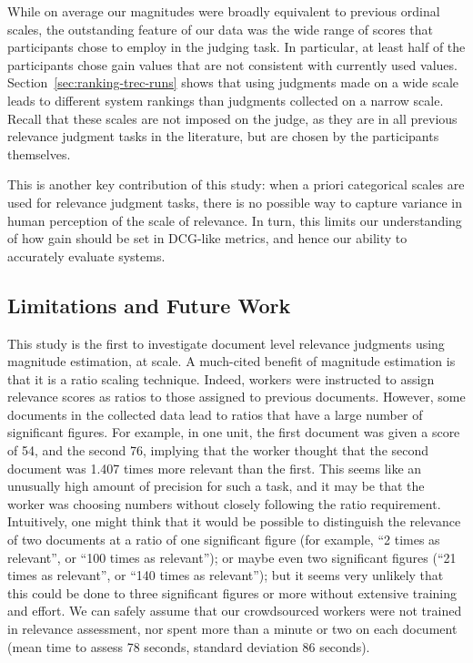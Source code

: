 While on average our magnitudes were broadly equivalent to previous
ordinal scales, the outstanding feature of our data was the wide range
of scores that participants chose to employ in the judging task.
In particular, at least half of the participants chose gain values that
are not consistent with currently used values.
Section~\ref{sec:ranking-trec-runs} shows that using judgments made on
a wide scale leads to different system rankings than judgments
collected on a narrow scale.
Recall that these scales are not imposed on the judge, as they are in
all previous relevance judgment tasks in the literature, but are chosen
by the participants themselves.

This is another key contribution of this study: when a priori
categorical scales are used for relevance judgment tasks, there is no
possible way to capture variance in human perception of the scale of
relevance.
In turn, this limits our understanding of how gain should be set in
DCG-like metrics, and hence our ability to accurately evaluate systems.

\subsection{Limitations and Future Work}
\label{sec:sig-figs}

This study is the first to investigate document level relevance
judgments using magnitude estimation, at scale.
A much-cited benefit of magnitude estimation is that it is a ratio
scaling technique.
Indeed, workers were instructed to assign relevance scores as ratios
to those assigned to previous documents.
However, some documents in the collected data lead to ratios that have
a large number of significant figures.
For example, in one unit, the first document was given a score of 54,
and the second 76, implying that the worker thought that the second
document was 1.407 times more relevant than the first.
This seems like an unusually high amount of precision for such a task,
and it may be that the worker was choosing numbers without closely
following the ratio requirement.
Intuitively, one might think that it would be possible to distinguish
the relevance of two documents at a ratio of one significant figure
(for example, ``2 times as relevant'', or ``100 times as relevant'');
or maybe even two significant figures (``21 times as relevant'', or
``140 times as relevant''); but it seems very unlikely that this could
be done to three significant figures or more without extensive training
and effort.
We can safely assume that our crowdsourced workers were not trained in
relevance assessment, nor spent more than a minute or two on each
document (mean time to assess 78 seconds, standard deviation 86
seconds).

